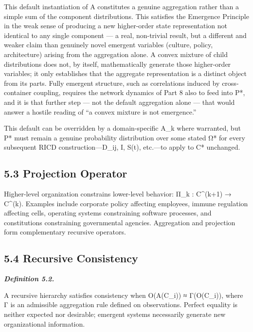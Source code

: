 \documentclass[
]{article}
\begin{document}
This default instantiation of A constitutes a genuine aggregation rather
than a simple sum of the component distributions. This satisfies the
Emergence Principle in the weak sense of producing a new higher-order
state representation not identical to any single component --- a real,
non-trivial result, but a different and weaker claim than genuinely
novel emergent variables (culture, policy, architecture) arising from
the aggregation alone. A convex mixture of child distributions does not,
by itself, mathematically generate those higher-order variables; it only
establishes that the aggregate representation is a distinct object from
its parts. Fully emergent structure, such as correlations induced by
cross-container coupling, requires the network dynamics of Part 8 also
to feed into P*, and it is that further step --- not the default
aggregation alone --- that would answer a hostile reading of ``a convex
mixture is not emergence.''

This default can be overridden by a domain-specific A\_k where
warranted, but P* must remain a genuine probability distribution over
some stated Ω* for every subsequent RICD construction---D\_ij, I, S(t),
etc.---to apply to C* unchanged.

\hypertarget{projection-operator}{%
\subsection{5.3 Projection Operator}\label{projection-operator}}

Higher-level organization constrains lower-level behavior: Π\_k :
C\^{}(k+1) → C\^{}(k). Examples include corporate policy affecting
employees, immune regulation affecting cells, operating systems
constraining software processes, and constitutions constraining
governmental agencies. Aggregation and projection form complementary
recursive operators.

\hypertarget{recursive-consistency}{%
\subsection{5.4 Recursive Consistency}\label{recursive-consistency}}

\emph{\textbf{Definition 5.2.}}

A recursive hierarchy satisfies consistency when O(A(C\_i)) ≈
Γ(O(C\_i)), where Γ is an admissible aggregation rule defined on
observations. Perfect equality is neither expected nor desirable;
emergent systems necessarily generate new organizational information.
\end{document}
